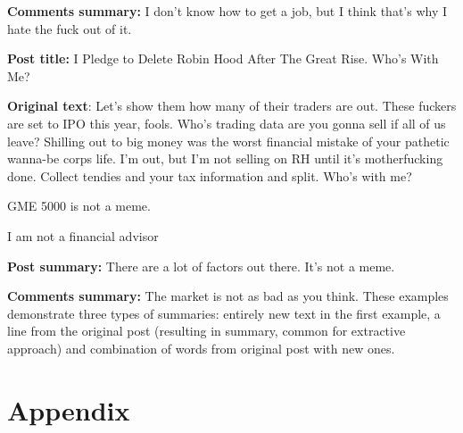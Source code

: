 \textbf{Comments summary:} I don’t know how to get a job, but I think that’s why I hate the fuck out of it.

\textbf{Post title:} I Pledge to Delete Robin Hood After The Great Rise. Who’s With Me?

\textbf{Original text}: Let’s show them how many of their traders are out. These fuckers are set to IPO this year, fools. Who’s trading data are you gonna sell if all of us leave? Shilling out to big money was the worst financial mistake of your pathetic wanna-be corps life. I’m out, but I’m not selling on RH until it’s motherfucking done. Collect tendies and your tax information and split. Who’s with me?

GME 5000 is not a meme.

I am not a financial advisor

\textbf{Post summary:} There are a lot of factors out there. It’s not a meme.

\textbf{Comments summary:} The market is not as bad as you think. These examples demonstrate three types of summaries: entirely new text in the first example, a line from the original post (resulting in summary, common for extractive approach) and combination of words from original post with new ones.

\chapter{Appendix}\label{app:B}

